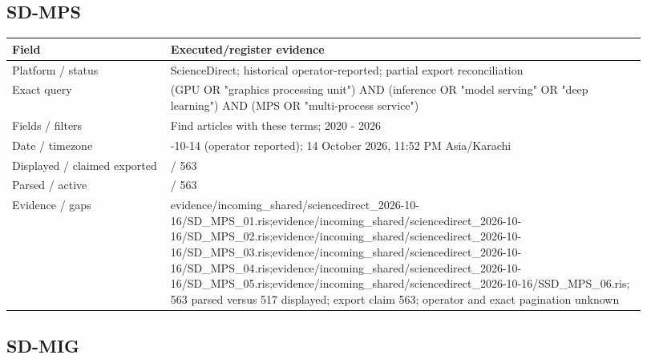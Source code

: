 \documentclass[12pt,a4paper]{article}
\begin{document}
\subsection*{SD-MPS}

{\small\begin{longtable}{>{\raggedright\arraybackslash}p{0.23\linewidth}>{\raggedright\arraybackslash}p{0.69\linewidth}}
\toprule
Field & Executed/\allowbreak{}register evidence\\\midrule
\endhead
Platform /\allowbreak{} status & ScienceDirect; historical operator-reported; partial export reconciliation\\
Exact query & (GPU OR "graphics processing unit") AND (inference OR "model serving" OR "deep learning") AND (MPS OR "multi-process service")\\
Fields /\allowbreak{} filters & Find articles with these terms; 2020 - 2026\\
Date /\allowbreak{} timezone & 2026-10-14 (operator reported); 14 October 2026, 11:\allowbreak{}52 PM Asia/\allowbreak{}Karachi\\
Displayed /\allowbreak{} claimed exported & 517 /\allowbreak{} 563\\
Parsed /\allowbreak{} active & 563 /\allowbreak{} 563\\
Evidence /\allowbreak{} gaps & evidence/\allowbreak{}incoming\_\allowbreak{}shared/\allowbreak{}sciencedirect\_\allowbreak{}2026-10-16/\allowbreak{}SD\_\allowbreak{}MPS\_\allowbreak{}01.ris;evidence/\allowbreak{}incoming\_\allowbreak{}shared/\allowbreak{}sciencedirect\_\allowbreak{}2026-10-16/\allowbreak{}SD\_\allowbreak{}MPS\_\allowbreak{}02.ris;evidence/\allowbreak{}incoming\_\allowbreak{}shared/\allowbreak{}sciencedirect\_\allowbreak{}2026-10-16/\allowbreak{}SD\_\allowbreak{}MPS\_\allowbreak{}03.ris;evidence/\allowbreak{}incoming\_\allowbreak{}shared/\allowbreak{}sciencedirect\_\allowbreak{}2026-10-16/\allowbreak{}SD\_\allowbreak{}MPS\_\allowbreak{}04.ris;evidence/\allowbreak{}incoming\_\allowbreak{}shared/\allowbreak{}sciencedirect\_\allowbreak{}2026-10-16/\allowbreak{}SD\_\allowbreak{}MPS\_\allowbreak{}05.ris;evidence/\allowbreak{}incoming\_\allowbreak{}shared/\allowbreak{}sciencedirect\_\allowbreak{}2026-10-16/\allowbreak{}SSD\_\allowbreak{}MPS\_\allowbreak{}06.ris; 563 parsed versus 517 displayed; export claim 563; operator and exact pagination unknown\\
\bottomrule
\end{longtable}}

\subsection*{SD-MIG}
\end{document}
